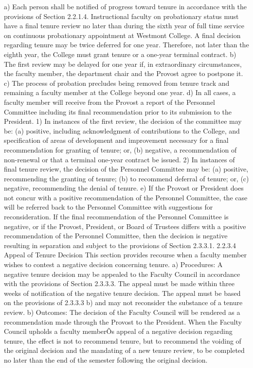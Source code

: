 \documentclass[letterpaper, 11pt]{article}
\begin{document}
a) Each person shall be notified of progress toward tenure in accordance with the provisions of Section 2.2.1.4.  Instructional faculty on probationary status must have a final tenure review no later than during the sixth year of full time service on continuous probationary appointment at Westmont College.  A final decision regarding tenure may be twice deferred for one year.  Therefore, not later than the eighth year, the College must grant tenure or a one-year terminal contract.
b) The first review may be delayed for one year if, in extraordinary circumstances, the faculty member, the department chair and the Provost agree to postpone it.
c) The process of probation precludes being removed from tenure track and remaining a faculty member at the College beyond one year.
d) In all cases, a faculty member will receive from the Provost a report of the Personnel Committee including its final recommendation prior to its submission to the President.
1) In instances of the first review, the decision of the committee may be:
(a) positive, including acknowledgment of contributions to the College, and specification of areas of development and improvement necessary for a final recommendation for granting of tenure; or,
(b) negative, a recommendation of non-renewal or that a terminal one-year contract be issued.
2) In instances of final tenure review, the decision of the Personnel Committee may be:
(a) positive, recommending the granting of tenure;
(b) to recommend deferral of tenure; or,
(c) negative, recommending the denial of tenure.
e) If the Provost or President does not concur with a positive recommendation of the Personnel Committee, the case will be referred back to the Personnel Committee with suggestions for reconsideration.  If the final recommendation of the Personnel Committee is negative, or if the Provost, President, or Board of Trustees differs with a positive recommendation of the Personnel Committee, then the decision is negative resulting in separation and subject to the provisions of Section 2.3.3.1.
2.2.3.4 Appeal of Tenure Decision
   This section provides recourse when a faculty member wishes to contest a negative decision concerning tenure.
a) Procedures:
   A negative tenure decision may be appealed to the Faculty Council in accordance with the provisions of Section 2.3.3.3.  The appeal must be made within three weeks of notification of the negative tenure decision.  The appeal must be based on the provisions of 2.3.3.3 b) and may not reconsider the substance of a tenure review. 
b) Outcomes:
   The decision of the Faculty Council will be rendered as a recommendation made through the Provost to the President.  When the Faculty Council upholds a faculty memberÕs appeal of a negative decision regarding tenure, the effect is not to recommend tenure, but to recommend the voiding of the original decision and the mandating of a new tenure review, to be completed no later than the end of the semester following the original decision.
\end{document}
